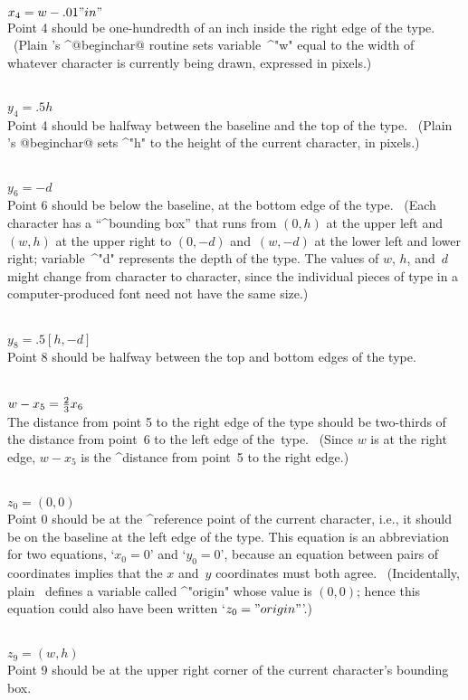 {{{{\\$x_4=w-.01"in"$\\
Point 4 should be one-hundredth of an inch inside the right edge of
the type. \ (Plain \MF's ^@beginchar@ routine sets variable~^"w" equal
to the width of whatever character is currently being drawn, expressed in
pixels.)

\\$y_4=.5h$\\
Point 4 should be halfway between the baseline and the top of the type.
\ (Plain \MF's @beginchar@ sets ^"h" to the height of the
current character, in pixels.)

\\$y_6=-d$\\
Point 6 should be below the baseline, at the bottom edge of the type.
\ (Each character has a ``^{bounding box}'' that runs from $(0,h)$
at the upper left and $(w,h)$ at the upper right to $(0,-d)$ and~$(w,-d)$
at the lower left and lower right; variable~^"d" represents the depth of
the type. The values of $w$, $h$, and~$d$ might change from character to
character, since the individual pieces of type in a computer-produced
font need not have the same size.)

\\$y_8=.5[h,-d]$\\
Point 8 should be halfway between the top and bottom edges of the type.

\\$w-x_5={2\over3}x_6$\\
The distance from point 5 to the right edge of the type should be
two-thirds of the distance from point~6 to the left edge of the~type.
\ (Since $w$ is at the right edge, $w-x_5$ is the ^{distance} from
point~5 to the right edge.)

\\$z_0=(0,0)$\\
Point 0 should be at the ^{reference point} of the current character,
i.e., it should be on the baseline at the left edge of the type.
This equation is an abbreviation for two equations, `$x_0=0$' and `$y_0=0$',
because an equation between pairs of coordinates implies that the $x$
and~$y$ coordinates must both agree. \ (Incidentally, plain \MF\
defines a variable called ^"origin" whose value is $(0,0)$; hence
this equation could also have been written `$z_0="origin"$'.)

\\$z_9=(w,h)$\\
Point 9 should be at the upper right corner of the current character's
bounding box.

}}}}
